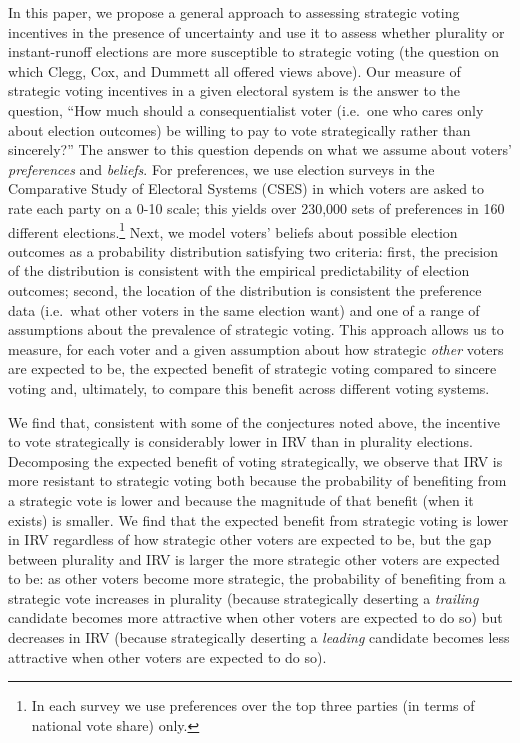 \documentclass[11pt,a4paper]{article}
\begin{document}
In this paper, we propose a general approach to assessing strategic voting incentives in the presence of uncertainty and use it to %
assess whether plurality or instant-runoff elections are more susceptible to strategic voting (the question on which Clegg, Cox, and Dummett all offered views above). 
Our measure of strategic voting incentives in a given electoral system is the answer to the question, ``How much should a consequentialist voter (i.e.\ one who cares only about election outcomes) be willing to pay to vote strategically rather than sincerely?'' %
The answer to this question depends on what we assume about voters' \emph{preferences} and \emph{beliefs}. For preferences, we use election surveys in the Comparative Study of Electoral Systems (CSES) in which voters are asked to rate each party on a 0-10 scale; this yields over 230,000 sets of preferences in 160 different elections.\footnote{In each survey we use preferences over the top three parties (in terms of national vote share) only.} Next, we model voters' beliefs about possible election outcomes as a probability distribution satisfying two criteria: first, the precision of the distribution is consistent with the empirical predictability of election outcomes; second, the location of the distribution is consistent the preference data (i.e.\ what other voters in the same election want) and one of a range of assumptions about the prevalence of strategic voting. This approach allows us to measure, for each voter and a given assumption about how strategic \emph{other} voters are expected to be, the expected benefit of strategic voting compared to sincere voting and, ultimately, to compare this benefit across different voting systems. 

We find that, consistent with some of the conjectures noted above, the incentive to vote strategically is considerably lower in IRV than in plurality elections. Decomposing the expected benefit of voting strategically, we observe that IRV is more resistant to strategic voting both because the probability of benefiting from a strategic vote is lower and because the magnitude of that benefit (when it exists) is smaller. We find that the expected benefit from strategic voting is lower in IRV regardless of how strategic other voters are expected to be, but the gap between plurality and IRV is larger the more strategic other voters are expected to be: as other voters become more strategic, the probability of benefiting from a strategic vote increases in plurality  (because strategically deserting a \emph{trailing} candidate becomes more attractive when other voters are expected to do so) but decreases in IRV (because strategically deserting a \emph{leading} candidate becomes  less attractive when other voters are expected to do so). 
\end{document}
